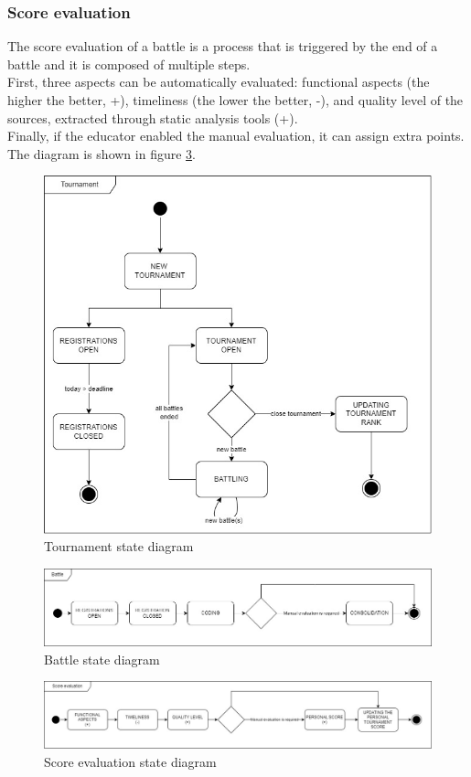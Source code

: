 \subsubsection*{Score evaluation}
The score evaluation of a battle is a process that is triggered by the end of a battle and it is composed of multiple steps.\\
First, three aspects can be automatically evaluated: functional aspects (the higher the better, +), timeliness (the lower the better, -), and quality level of the sources, extracted through static analysis tools (+). \\
Finally, if the educator enabled the manual evaluation, it can assign extra points. \\
  The diagram is shown in figure \ref{fig:score-evaluation-state-diagram}.

\begin{figure}[H]
    \centering
    \includegraphics[width=.8\textwidth]{images/state_diagrams/tournament.jpg}
    \caption{Tournament state diagram}
    \label{fig:tournament-state-diagram}
\end{figure}
\begin{figure}[H]
    \centering
    \includegraphics[width=1\textwidth]{images/state_diagrams/battle.jpg}
    \caption{Battle state diagram}
    \label{fig:battle-state-diagram}
\end{figure}
\begin{figure}[H]
    \centering
    \includegraphics[width=1\textwidth]{images/state_diagrams/score_evaluation.jpg}
    \caption{Score evaluation state diagram}
    \label{fig:score-evaluation-state-diagram}
\end{figure}

